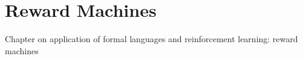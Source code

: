 \section{Reward Machines}

Chapter on application of formal languages and reinforcement learning: reward machines \cite{RM2018} \cite{LTL2019} \cite{RM2022}
